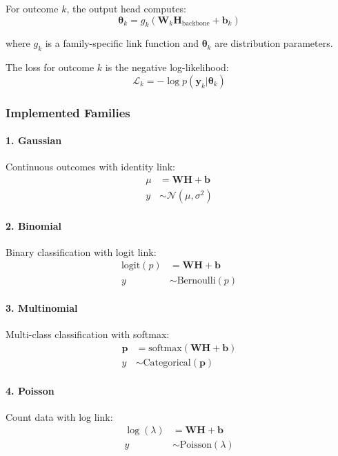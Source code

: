 \documentclass[12pt,a4paper]{article}
\newcommand{\N}{\mathcal{N}}
\newcommand{\by}{\mathbf{y}}
\newcommand{\btheta}{\boldsymbol{\theta}}
\begin{document}
For outcome $k$, the output head computes:
\begin{equation}
    \btheta_k = g_k(\mathbf{W}_k\mathbf{H}_{\text{backbone}} + \mathbf{b}_k)
\end{equation}

where $g_k$ is a family-specific link function and $\btheta_k$ are distribution parameters.

The loss for outcome $k$ is the negative log-likelihood:
\begin{equation}
    \mathcal{L}_k = -\log p(\by_k | \btheta_k)
\end{equation}

\subsubsection{Implemented Families}

\paragraph{1. Gaussian}
Continuous outcomes with identity link:
\begin{align}
    \mu &= \mathbf{W}\mathbf{H} + \mathbf{b} \\
    y &\sim \N(\mu, \sigma^2)
\end{align}

\paragraph{2. Binomial}
Binary classification with logit link:
\begin{align}
    \text{logit}(p) &= \mathbf{W}\mathbf{H} + \mathbf{b} \\
    y &\sim \text{Bernoulli}(p)
\end{align}

\paragraph{3. Multinomial}
Multi-class classification with softmax:
\begin{align}
    \mathbf{p} &= \text{softmax}(\mathbf{W}\mathbf{H} + \mathbf{b}) \\
    y &\sim \text{Categorical}(\mathbf{p})
\end{align}

\paragraph{4. Poisson}
Count data with log link:
\begin{align}
    \log(\lambda) &= \mathbf{W}\mathbf{H} + \mathbf{b} \\
    y &\sim \text{Poisson}(\lambda)
\end{align}
\end{document}
